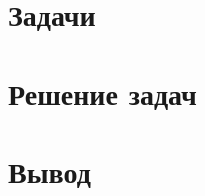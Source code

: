 \documentclass[a4paper, 14pt, report]{ncc}
\begin{document}
\def\chaptername{Часть}
\def\contentsname{Содержание}



\tableofcontents
\clearpage	


\chapter[Задачи]{Задачи}


\chapter[Решение задач]{Решение задач}




\chapter[Вывод]{Вывод}

\end{document}
